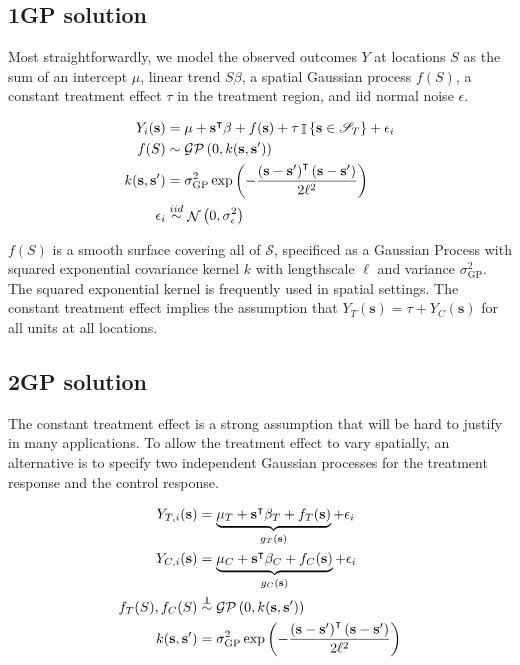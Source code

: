 \documentclass[letter]{article}
\newcommand{\genericdel}[3]{%
      \left#1#3\right#2
    }
\newcommand{\del}[1]{\genericdel(){#1}}
\newcommand{\cbr}[1]{\genericdel\{\}{#1}}
\DeclareMathOperator{\Ind}{\mathbb{I}}
\DeclareMathOperator{\normal}{\mathcal{N}}
\newcommand{\gp}{\mathcal{GP}}
\newcommand{\trans}{^{\intercal}}
\newcommand{\scrS}{\mathscr{S}}
\newcommand{\sigmaf}{\sigma_{\mathrm{GP}}}
\newcommand{\svec}{\mathbf{s}}
\newcommand{\indep}{\protect\mathpalette{\protect\independenT}{\perp}}
\def\independenT#1#2{\mathrel{\rlap{$#1#2$}\mkern2mu{#1#2}}}
\newcommand{\iid}{iid}
\begin{document}
\subsection{1GP solution}\label{gp-solution}

Most straightforwardly, we model the observed outcomes \(Y\) at
locations \(S\) as the sum of an intercept \(\mu\), linear trend
\(S\beta\), a spatial Gaussian process \(f(S)\), a constant treatment
effect \(\tau\) in the treatment region, and iid normal noise
\(\epsilon\).

\begin{align}
Y_i(\svec) &= \mu+\svec\trans\beta + f(\svec) + \tau \Ind\cbr{\svec \in \scrS_T} + \epsilon_i \\
f(S) &\sim \gp\del{0, k(\svec, \svec')} \\
k(\svec,\svec') &= \sigmaf^2 \exp\del{ - \frac{\del{\svec-\svec'}\trans\del{\svec-\svec'}}{2 \ell^2}} \\
\epsilon_i &\overset{\iid}{\sim} \normal\del{0,\sigma_\epsilon^2}
\end{align}

\(f(S)\) is a smooth surface covering all of \(\scrS\), specificed as a
Gaussian Process with squared exponential covariance kernel \(k\) with
lengthscale \(\ell\) and variance \(\sigmaf^2\). The squared exponential
kernel is frequently used in spatial settings. The constant treatment
effect implies the assumption that \(Y_T(\svec) = \tau + Y_C(\svec)\)
for all units at all locations.

\subsection{2GP solution}\label{gp-solution-1}

The constant treatment effect is a strong assumption that will be hard
to justify in many applications. To allow the treatment effect to vary
spatially, an alternative is to specify two independent Gaussian
processes for the treatment response and the control response.

\begin{align}
Y_{T,i}(\svec) &= \underbrace{\mu_T + \svec\trans\beta_T + f_T(\svec)}_{g_T(\svec)} + \epsilon_i \\
Y_{C,i}(\svec) &= \underbrace{\mu_C + \svec\trans\beta_C + f_C(\svec)}_{g_C(\svec)} + \epsilon_i \\
f_T(S), f_C(S) &\overset{\indep}{\sim} \gp\del{0, k(\svec, \svec')} \\
k(\svec,\svec') &= \sigmaf^2 \exp\del{ - \frac{\del{\svec-\svec'}\trans\del{\svec-\svec'}}{2 \ell^2}} \\
\end{align}
\end{document}
